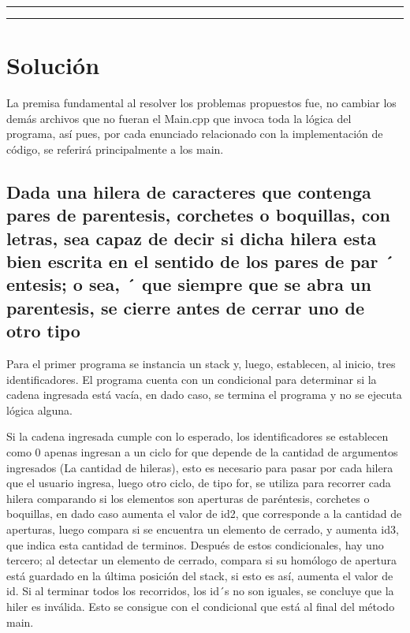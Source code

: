 \documentclass[11pt]{article}
\begin{document}
\tableofcontents
\listoffigures
\newpage

\hrule
\hrule

\newpage
\section{Solución}

La premisa fundamental al resolver los problemas propuestos fue, no cambiar los demás archivos que no fueran el Main.cpp que invoca toda la lógica del programa, así pues, por cada enunciado relacionado con la implementación de código, se referirá principalmente a los main.

\subsection{Dada una hilera de caracteres que contenga pares de parentesis, corchetes o boquillas, con letras, sea
capaz de decir si dicha hilera esta bien escrita en el sentido de los pares de par ´ entesis; o sea, ´
que siempre que se abra un parentesis, se cierre antes de cerrar uno de otro tipo}

Para el primer programa se instancia un stack y, luego, establecen, al inicio, tres identificadores. El programa cuenta con un condicional para determinar si la cadena ingresada está vacía, en dado caso, se termina el programa y no se ejecuta lógica alguna.

Si la cadena ingresada cumple con lo esperado, los identificadores se establecen como 0 apenas ingresan a un ciclo for que depende de la cantidad de argumentos ingresados (La cantidad de hileras), esto es necesario para pasar por cada hilera que el usuario ingresa, luego otro ciclo, de tipo for, se utiliza para recorrer cada hilera comparando si los elementos son aperturas de paréntesis, corchetes o boquillas, en dado caso aumenta el valor de id2, que corresponde a la cantidad de aperturas, luego compara si se encuentra un elemento de cerrado, y aumenta id3, que indica esta cantidad de terminos. Después de estos condicionales, hay uno tercero; al detectar un elemento de cerrado, compara si su homólogo de apertura está guardado en la última posición del stack, si esto es así, aumenta el valor de id. Si al terminar todos los recorridos, los id´s no son iguales, se concluye que la hiler es inválida. Esto se consigue con el condicional que está al final del método main.
\end{document}
